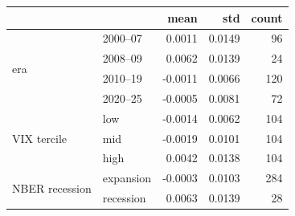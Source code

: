 \begin{tabular}{llrrr}
\toprule
 &  & mean & std & count \\
\midrule
\multirow[t]{4}{*}{era} & 2000–07 & 0.0011 & 0.0149 & 96 \\
 & 2008–09 & 0.0062 & 0.0139 & 24 \\
 & 2010–19 & -0.0011 & 0.0066 & 120 \\
 & 2020–25 & -0.0005 & 0.0081 & 72 \\
\cline{1-5}
\multirow[t]{3}{*}{VIX tercile} & low & -0.0014 & 0.0062 & 104 \\
 & mid & -0.0019 & 0.0101 & 104 \\
 & high & 0.0042 & 0.0138 & 104 \\
\cline{1-5}
\multirow[t]{2}{*}{NBER recession} & expansion & -0.0003 & 0.0103 & 284 \\
 & recession & 0.0063 & 0.0139 & 28 \\
\cline{1-5}
\bottomrule
\end{tabular}
